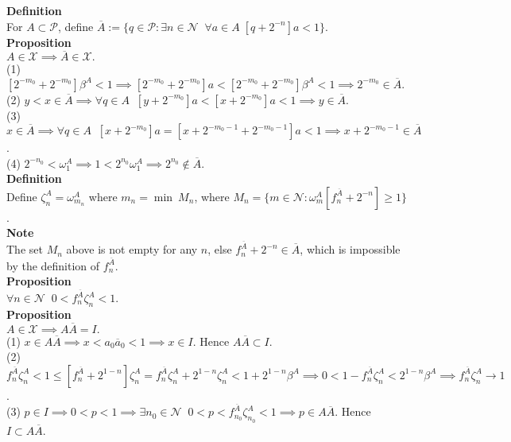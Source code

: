 \documentclass{article}
\newcommand{\targetset}{ \mathscr{X}}
\newcommand{\sourceset}{ \mathscr{P}}
\newcommand{\naturals}{ \mathscr{N}}
\newcommand{\carpenter}{ \omega }
\newcommand{\elt}{q}
\newcommand{\invmark}{\overline}
\newcommand{\umbrella}{\beta}
\newcommand{\prevert}{\zeta}
\begin{document}
\textbf{Definition}\\
For $A \subset \sourceset$, define $\invmark A := \{ \elt \in \sourceset : \exists n \in \naturals \;\; \forall a \in A \; [\elt + 2^{-n}]a < 1\}$.\\

\textbf{Proposition}\\
$A \in \targetset \implies \invmark A \in \targetset.$\\

(1) $[2^{-m_0} + 2^{-m_0} ]\umbrella^A < 1 \implies [2^{-m_0} + 2^{-m_0} ]a < [2^{-m_0} + 2^{-m_0} ]\umbrella^A < 1 \implies 2^{-m_0} \in \invmark A.$\\
(2) $y < x \in \invmark A \implies  \forall \elt \in A \;\; [ y + 2^{-m_0} ]a <  [ x + 2^{-m_0} ]a< 1 \implies y \in \invmark A$.\\
(3) $x \in \invmark A \implies \forall \elt \in A \;\; [x + 2^{-m_0}]a = [x + 2^{-m_0-1} + 2^{-m_0-1}]a < 1 \implies x + 2^{-m_0-1} \in \invmark A$.\\
(4) $2^{-n_0} < \carpenter^A_1 \implies 1 < 2^{n_0} \carpenter^A_1 \implies 2^{n_0} \notin \invmark A$.\\

\textbf{Definition}\\
Define $\prevert^{A}_n = \carpenter^A_{m_n}$ where $m_n = \min\ M_n$, where $M_n = \{ m \in \naturals : \carpenter^A_m [ f^{\invmark A}_n + 2^{-n}] \ge 1 \}$.\\

\textbf{Note}\\
The set $M_n$  above is not empty for any $n$, else $f^{\invmark A}_n + 2^{-n} \in \invmark A$, which is impossible by the definition of $f^{\invmark A}_n$.\\

\textbf{Proposition}\\
$\forall n \in \naturals \;\; 0 < f^{\invmark A}_n \prevert^{ A}_n < 1.$\\




\textbf{Proposition}\\
$A \in \targetset \implies A \invmark A = I.$ \\

(1) $x \in A \invmark A \implies x < a_0 \invmark a_0 < 1 \implies x \in I$. Hence $A \invmark A \subset I$.\\  
(2) $ f^{\invmark A}_n \prevert^{A}_n < 1 \le [f^{\invmark A}_n +2^{1-n}] \prevert^{ A}_n = f^{\invmark A}_n \prevert^{ A}_n + 2^{1-n}\prevert^{A}_n < 1 + 2^{1-n}\umbrella^A \implies 0 < 1 - f^{\invmark A}_n \prevert^{ A}_n < 2^{1-n}\umbrella^A   \implies f^{\invmark A}_n \prevert^{ A}_n \to 1$.\\
(3) $ p \in I \implies 0 < p < 1 \implies \exists n_0 \in \naturals \;\; 0 < p <  f^{\invmark A}_{n_0}  \prevert^{ A}_{n_0} < 1 \implies p \in A \invmark A$. Hence $ I \subset A \invmark A $.\\ \\
\end{document}
